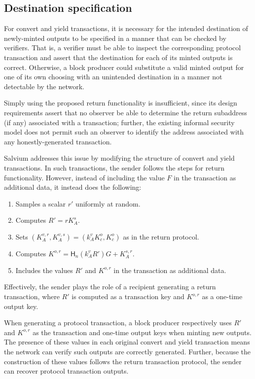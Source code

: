\documentclass{article}
\newcommand{\hash}{\mathsf{H}_n}
\begin{document}
\subsection{Destination specification}

For convert and yield transactions, it is necessary for the intended destination of newly-minted outputs to be specified in a manner that can be checked by verifiers.
That is, a verifier must be able to inspect the corresponding protocol transaction and assert that the destination for each of its minted outputs is correct.
Otherwise, a block producer could substitute a valid minted output for one of its own choosing with an unintended destination in a manner not detectable by the network.

Simply using the proposed return functionality is insufficient, since its design requirements assert that no observer be able to determine the return subaddress (if any) associated with a transaction; further, the existing informal security model does not permit such an observer to identify the address associated with any honestly-generated transaction.

Salvium addresses this issue by modifying the structure of convert and yield transactions.
In such transactions, the sender follows the steps for return functionality.
However, instead of including the value $F$ in the transaction as additional data, it instead does the following:
\begin{enumerate}
	\item Samples a scalar $r'$ uniformly at random.
	\item Computes $R' = r K_A^s$.
	\item Sets $(K_A^{v,r}, K_A^{v,s}) = (k_A^v K_c^o, K_c^o)$ as in the return protocol.
	\item Computes $K^{o,r} = \hash(k_A^v R') G + K_A^{s,r}$.
	\item Includes the values $R'$ and $K^{o,r}$ in the transaction as additional data.
\end{enumerate}
Effectively, the sender plays the role of a recipient generating a return transaction, where $R'$ is computed as a transaction key and $K^{o,r}$ as a one-time output key.

When generating a protocol transaction, a block producer respectively uses $R'$ and $K^{o,r}$ as the transaction and one-time output keys when minting new outputs.
The presence of these values in each original convert and yield transaction means the network can verify such outputs are correctly generated.
Further, because the construction of these values follows the return transaction protocol, the sender can recover protocol transaction outputs.
\end{document}
